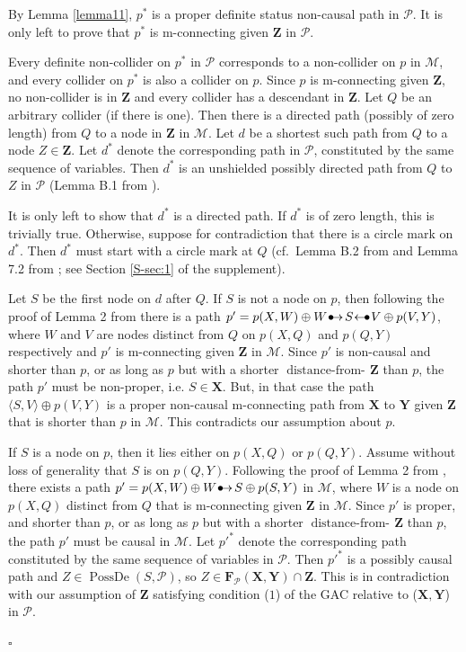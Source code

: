 \documentclass[]{article}
\DeclareMathOperator{\PossDe}{PossDe}
\DeclareMathOperator{\distancefrom}{distance-from-\!}
\theoremstyle{definition}
\newenvironment{proofof}[1][]{\begin{trivlist}
   \item[\hskip \labelsep {\bfseries Proof of #1.}]}{\end{trivlist} \hfill $\square$}
\theoremstyle{remark}
\newcommand{\g}[1][G]{\mathcal{#1}}
\newcommand{\fb}[2][X,Y]{\mathbf{F}_{#2}(\mathbf{#1})}%
\newcommand{\pstar}[1][p]{{#1}^{*}}
\newcommand{\bulletarrow}{
  \setlength{\unitlength}{1mm}
  \begin{picture}(5,1)(0,0)
    \put(0.2,0){$\bullet$}
    \put(1,0){$\rightarrow$}
  \end{picture}
}
\newcommand{\arrowbullet}{
  \setlength{\unitlength}{1mm}
  \begin{picture}(5,1)(0,0)
    \put(0.2,0){$\leftarrow$}
    \put(3,0){$\bullet$}
  \end{picture}
}
\begin{document}
  \begin{proofof}[Lemma \ref{lemma22}]
By Lemma \ref{lemma11}, $\pstar$ is a proper definite status non-causal path in $\g[P]$. It is only left to prove that $\pstar$ is m-connecting given $\mathbf{Z}$ in $\g[P]$.
   
Every definite non-collider on $\pstar$ in $\g[P]$ corresponds to a non-collider on $p$ in $\g[M]$, and every collider on $\pstar$ is also a collider on $p$. Since $p$ is m-connecting given $\mathbf{Z}$, no non-collider is in $\mathbf{Z}$ and every collider has a descendant in $\mathbf{Z}$. Let $Q$ be an arbitrary collider (if there is one). Then there is a directed path (possibly of zero length) from $Q$ to a node in $\mathbf{Z}$ in $\g[M]$. Let $d$ be a shortest such path from $Q$ to a node $Z \in \mathbf{Z}$. Let $\pstar[d]$ denote the corresponding path in $\g[P]$, constituted by the same sequence of variables. Then $\pstar[d]$ is an unshielded possibly directed path from $Q$ to $Z$ in $\g[P]$ (Lemma B.1 from \citet{zhang2008completeness}).
   
   It is only left to show that $\pstar[d]$ is a directed path. If $\pstar[d]$ is of zero length, this is trivially true. Otherwise,
  suppose for contradiction that there is a circle mark on $\pstar[d]$. Then $\pstar[d]$ must start with a circle mark at $Q$ 
  (cf.\ Lemma B.2 from \citealp{zhang2008completeness} and Lemma 7.2 from \citealp{maathuis2013generalized}; see Section \ref{S-sec:1} of the supplement).
  
 Let $S$ be the first node on $d$ after $Q$.
 If $S$ is not a node on $p$, then following the proof of Lemma 2 from \citet{zhang2006causal} there is a path  $p' = p(X,W) \oplus W \bulletarrow S \arrowbullet V \oplus p(V,Y)$, where $W$ and $V$ are nodes distinct from $Q$ on $p(X,Q)$ and $p(Q,Y)$ respectively and $p'$ is m-connecting given $\mathbf{Z}$ in $\g[M]$.
 Since $p'$ is non-causal and shorter than $p$, or as long as $p$ but with a shorter $\distancefrom{\mathbf{Z}}$ than $p$, the path $p'$ must be non-proper, i.e. $S \in \mathbf{X}$.  But, in that case the path $\langle S,V \rangle \oplus p(V,Y)$ is a proper non-causal m-connecting path from $\mathbf{X}$ to $\mathbf{Y}$ given $\mathbf{Z}$ that is shorter than $p$ in $\g[M]$. This contradicts our assumption about $p$.

 If $S$ is a node on $p$, then it lies either on $p(X,Q)$ or $p(Q,Y)$. Assume without loss of generality that $S$ is on $p(Q,Y)$. Following the proof of Lemma 2 from \citet{zhang2006causal}, there exists a path $p' =p(X,W) \oplus  W  \bulletarrow S  \oplus p(S,Y)$ in $\g[M]$, where $W$ is a node on $p(X,Q)$ distinct from $Q$ that is m-connecting given $\mathbf{Z}$ in $\g[M]$.
Since $p'$  is proper, and shorter than $p$, or as long as $p$ but with a shorter $\distancefrom{\mathbf{Z}}$ than $p$, the path $p'$ must be causal in $\g[M]$. Let $\pstar[p']$ denote the corresponding path constituted by the same sequence of variables in $\g[P]$.  Then $\pstar[p']$ is a possibly causal path and $Z \in \PossDe(S,\g[P])$, so $Z \in \fb{\g[P]} \cap \mathbf{Z}$. This is in contradiction with our assumption of $\mathbf{Z}$ satisfying condition ($1$) of the GAC relative to ($\mathbf{X,Y}$) in $\g[P]$.


\end{proofof}
\end{document}
